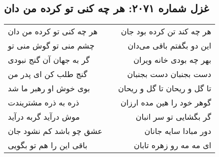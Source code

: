 \begin{center}
\section*{غزل شماره ۲۰۷۱: هر چه کنی تو کرده من دان}
\label{sec:2071}
\begin{longtable}{l p{0.5cm} r}
هر چه کنی تو کرده من دان
&&
هر چه کند تن کرده بود جان
\\
چشم منی تو گوش منی تو
&&
این دو بگفتم باقی می‌دان
\\
گر به جهان آن گنج نبودی
&&
بهر چه بودی خانه ویران
\\
گنج طلب کن ای پدر من
&&
دست بجنبان دست بجنبان
\\
بوی خوش او رهبر ما شد
&&
تا گل و ریحان تا گل و ریحان
\\
ذره به ذره مشتریندت
&&
گوهر خود را هین مده ارزان
\\
موش درآید گربه درآید
&&
گر بگشایی تو سر انبان
\\
عشق چو باشد کم نشود جان
&&
دور مبادا سایه جانان
\\
باقی این را هم تو بگویی
&&
ای مه مه رو زهره تابان
\\
\end{longtable}
\end{center}
